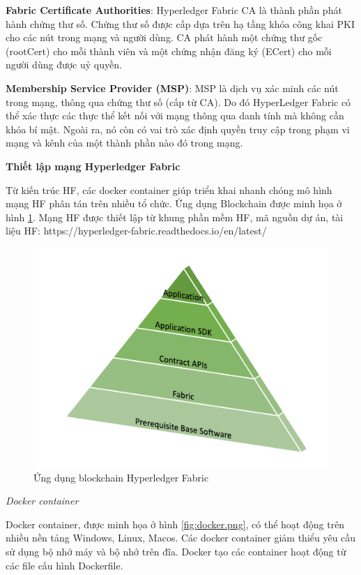 \textbf{Fabric Certificate Authorities}: Hyperledger Fabric CA là thành phần phát hành chứng thư số. Chứng thư số được cấp dựa trên hạ tầng khóa công khai PKI cho các nút trong mạng và người dùng. CA phát hành một chứng thư gốc (rootCert) cho mỗi thành viên và một chứng nhận đăng ký (ECert) cho mỗi người dùng được uỷ quyền.

\textbf{Membership Service Provider (MSP)}: MSP là dịch vụ xác minh các nút trong mạng, thông qua chứng thư số (cấp từ CA). Do đó HyperLedger Fabric có thể xác thực các thực thể kết nối với mạng thông qua danh tính mà không cần khóa bí mật. Ngoài ra, nó còn có vai trò xác định quyền truy cập trong phạm vi mạng và kênh của một thành phần nào đó trong mạng.

\textbf{Thiết lập mạng Hyperledger Fabric}

Từ kiến trúc HF, các docker container giúp triển khai nhanh chóng  mô hình mạng HF phân tán trên nhiều tổ chức. Ứng dụng Blockchain được minh họa ở hình \ref{fig:getting_started_image2.png}.
Mạng HF được thiết lập từ khung phần mềm HF, mã nguồn dự án, tài liệu HF: https://hyperledger-fabric.readthedocs.io/en/latest/ 


\begin{figure}[htbp]
\centering
\includegraphics[width=.9\linewidth]{img/getting_started_image2.png}
\caption{Ứng dụng blockchain Hyperledger Fabric}
\label{fig:getting_started_image2.png}
\end{figure}

\emph{Docker container}

Docker container, được minh họa ở hình \ref{fig:docker.png}, có thể hoạt động trên nhiều nền tảng Windows, Linux, Macos.
Các docker container giảm thiểu yêu cầu sử dụng bộ nhớ máy và bộ nhớ trên đĩa.
Docker tạo các container hoạt động từ các file cấu hình Dockerfile. 

